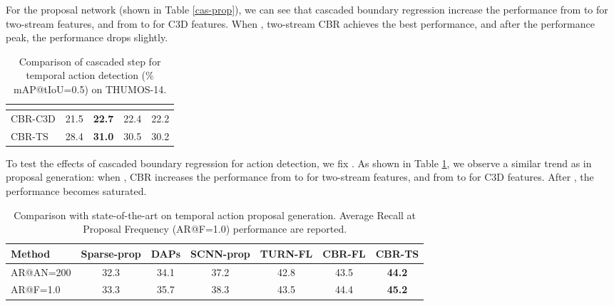 \documentclass{bmvc2k}
\begin{document}
For the proposal network (shown in Table \ref{cas-prop}), we can see that cascaded boundary regression increase the performance from  to  for two-stream features, and from  to  for C3D features. When , two-stream CBR achieves the best performance, and after the performance peak, the performance drops slightly. 

\begin{table}[h]\small
\centering
\caption{Comparison of cascaded step  for temporal action detection (\% mAP@tIoU=0.5) on THUMOS-14.}
\label{cas-det}
\begin{tabular}{l|c|c|c|c}
\hline
           &  & \multicolumn{1}{c|}{} & \multicolumn{1}{c|}{} & \multicolumn{1}{c}{} \\ \hline
CBR-C3D        &   21.5  &      \textbf{22.7}      &       22.4       &     22.2      \\ \hline
CBR-TS &   28.4  &      \textbf{31.0}   &        30.5      &        30.2       \\ \hline
\end{tabular}
\end{table}

To test the effects of cascaded boundary regression for action detection, we fix .  As shown in Table \ref{cas-det}, we observe a similar trend as in proposal generation: when , CBR increases the performance from  to  for two-stream features, and from  to  for C3D features. After , the performance becomes saturated. 

\begin{table}[h]\footnotesize
\centering
\caption{Comparison with state-of-the-art on temporal action proposal generation. Average Recall at Proposal Frequency (AR@F=1.0) performance are reported.}
\label{proposal-st}
\begin{tabular}{l|c|c|c|c||c|c}
\hline
Method & Sparse-prop\cite{Heilbron_2016_CVPR} & DAPs\cite{escorcia2016daps} & SCNN-prop\cite{Shou_2016_CVPR}  & TURN-FL \cite{gao2017turn}  & CBR-FL & CBR-TS \\ \hline
AR@AN=200 &  32.3  &  34.1    &    37.2 &  42.8   &   43.5   & \textbf{44.2}    \\   \hline 
AR@F=1.0 &  33.3  &  35.7    &    38.3 &  43.5   &   44.4   &  \textbf{45.2}  \\   \hline      
\end{tabular}
\end{table}
\end{document}
